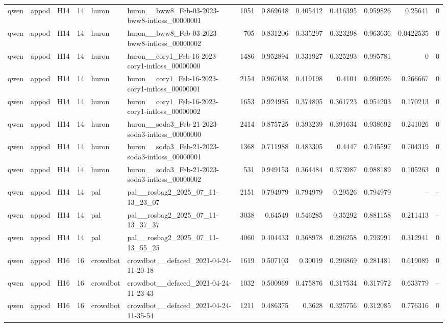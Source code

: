 \begin{longtable}{lllrllrrrrrrr}
qwen & appod & H14 & 14 & huron & huron\_\_bww8\_Feb-03-2023-bww8-intloss\_00000001 & 1051 & 0.869648 & 0.405412 & 0.416395 & 0.959826 & 0.25641 & 0 \\
qwen & appod & H14 & 14 & huron & huron\_\_bww8\_Feb-03-2023-bww8-intloss\_00000002 & 705 & 0.831206 & 0.335297 & 0.323298 & 0.963636 & 0.0422535 & 0 \\
qwen & appod & H14 & 14 & huron & huron\_\_cory1\_Feb-16-2023-cory1-intloss\_00000000 & 1486 & 0.952894 & 0.331927 & 0.325293 & 0.995781 & 0 & 0 \\
qwen & appod & H14 & 14 & huron & huron\_\_cory1\_Feb-16-2023-cory1-intloss\_00000001 & 2154 & 0.967038 & 0.419198 & 0.4104 & 0.990926 & 0.266667 & 0 \\
qwen & appod & H14 & 14 & huron & huron\_\_cory1\_Feb-16-2023-cory1-intloss\_00000002 & 1653 & 0.924985 & 0.374805 & 0.361723 & 0.954203 & 0.170213 & 0 \\
qwen & appod & H14 & 14 & huron & huron\_\_soda3\_Feb-21-2023-soda3-intloss\_00000000 & 2414 & 0.875725 & 0.393239 & 0.391634 & 0.938692 & 0.241026 & 0 \\
qwen & appod & H14 & 14 & huron & huron\_\_soda3\_Feb-21-2023-soda3-intloss\_00000001 & 1368 & 0.711988 & 0.483305 & 0.4447 & 0.745597 & 0.704319 & 0 \\
qwen & appod & H14 & 14 & huron & huron\_\_soda3\_Feb-21-2023-soda3-intloss\_00000002 & 531 & 0.949153 & 0.364484 & 0.373987 & 0.988189 & 0.105263 & 0 \\
qwen & appod & H14 & 14 & pal & pal\_\_rosbag2\_2025\_07\_11-13\_23\_07 & 2151 & 0.794979 & 0.794979 & 0.29526 & 0.794979 & -- & -- \\
qwen & appod & H14 & 14 & pal & pal\_\_rosbag2\_2025\_07\_11-13\_37\_37 & 3038 & 0.64549 & 0.546285 & 0.35292 & 0.881158 & 0.211413 & -- \\
qwen & appod & H14 & 14 & pal & pal\_\_rosbag2\_2025\_07\_11-13\_55\_25 & 4060 & 0.404433 & 0.368978 & 0.296258 & 0.793991 & 0.312941 & 0 \\
qwen & appod & H16 & 16 & crowdbot & crowdbot\_\_defaced\_2021-04-24-11-20-18 & 1619 & 0.507103 & 0.30019 & 0.296869 & 0.281481 & 0.619089 & 0 \\
qwen & appod & H16 & 16 & crowdbot & crowdbot\_\_defaced\_2021-04-24-11-23-43 & 1032 & 0.500969 & 0.475876 & 0.317534 & 0.317972 & 0.633779 & -- \\
qwen & appod & H16 & 16 & crowdbot & crowdbot\_\_defaced\_2021-04-24-11-35-54 & 1211 & 0.486375 & 0.3628 & 0.325756 & 0.312085 & 0.776316 & 0 \\

\end{longtable}
